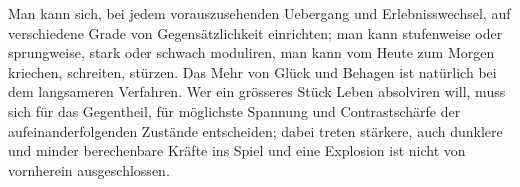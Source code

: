 Man kann sich, bei jedem vorauszusehenden Uebergang und Erlebnisswechsel, auf verschiedene Grade von Gegensätzlichkeit einrichten; man kann stufenweise oder sprungweise, stark oder schwach moduliren, man kann vom Heute zum Morgen kriechen, schreiten, stürzen. Das Mehr von Glück und Behagen ist natürlich bei dem langsameren Verfahren. Wer ein grösseres Stück Leben absolviren will, muss sich für das Gegentheil, für möglichste Spannung und Contrastschärfe der aufeinanderfolgenden Zustände entscheiden; dabei treten stärkere, auch dunklere und minder berechenbare Kräfte ins Spiel und eine Explosion ist nicht von vornherein ausgeschlossen.
\par

